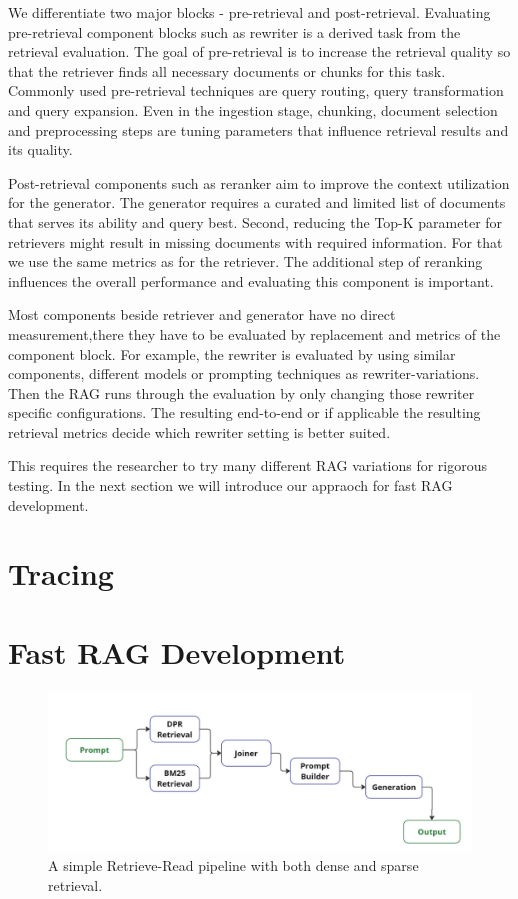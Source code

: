 We differentiate two major blocks - pre-retrieval and post-retrieval. Evaluating pre-retrieval component blocks such as rewriter is a derived task from the retrieval evaluation. The goal of pre-retrieval is to increase the retrieval quality so that the retriever finds all necessary documents or chunks for this task. Commonly used pre-retrieval techniques are query routing, query transformation and query expansion. Even in the ingestion stage, chunking, document selection and preprocessing steps are tuning parameters that influence retrieval results and its quality. 

Post-retrieval components such as reranker aim to improve the context utilization for the generator. The generator requires a curated and limited list of documents that serves its ability and query best. Second, reducing the Top-K parameter for retrievers might result in missing documents with required information. For that we use the same metrics as for the retriever. The additional step of reranking influences the overall performance and evaluating this component is important. 

Most components beside retriever and generator have no direct measurement,there they have to be evaluated by replacement and metrics of the component block. For example, the rewriter is evaluated by using similar components, different models or prompting techniques as rewriter-variations. Then the RAG runs through the evaluation by only changing those rewriter specific configurations. The resulting end-to-end or if applicable the resulting retrieval metrics decide which rewriter setting is better suited.

This requires the researcher to try many different RAG variations for rigorous testing. In the next section we will introduce our appraoch for fast RAG development.

\section{Tracing}

\section{Fast RAG Development}

\begin{figure}[b]
    \centering
    \includegraphics[width=\textwidth]{images/showcase-pipeline.pdf}
    \caption{A simple Retrieve-Read pipeline with both dense and sparse retrieval.}
    \label{fig:showcase}
\end{figure}

